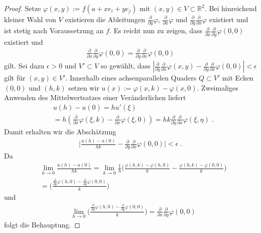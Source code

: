 \begin{proof}
Setze $\varphi(x,y) := f(a + x e_i + y e_j)$ mit $(x,y) \in  V \subset \mathbb{R}^2$. Bei hinreichend kleiner Wahl von $V$ existieren die Ableitungen $ \frac{\partial}{\partial y} \varphi$, $ \frac{\partial}{\partial x} \varphi$ und $ \frac{\partial}{\partial y} \frac{\partial}{\partial x} \varphi$  existiert und ist stetig nach Voraussetzung an $f$. Es reicht nun zu zeigen, dass $ \frac{\partial}{\partial x} \frac{\partial}{\partial y} \varphi (0,0)$ existiert  und 
\begin{align*}
\frac{\partial}{\partial x} \frac{\partial}{\partial y} \varphi(0,0) = \frac{\partial}{\partial y} \frac{\partial}{\partial x} \varphi (0,0)
\end{align*} 
gilt.  Sei dazu $\epsilon > 0$ und $V' \subset V$ so gewählt, dass $| \frac{\partial}{\partial y} \frac{\partial}{\partial x} \varphi(x,y) -  \frac{\partial}{\partial y} \frac{\partial}{\partial x} \varphi(0,0) | < \epsilon$ gilt für $(x,y) \in V'$.
Innerhalb eines achsenparallelen Quaders $Q \subset V'$  mit Ecken $(0,0)$ und $(h,k)$ setzen wir $u(x) := \varphi(x,  k) - \varphi(x, 0)$. Zweimaliges Anwenden des Mittelwertsatzes einer Veränderlichen liefert  
\begin{align*}
& u(h) - u(0) = hu'(\xi) \\
& = h(  \frac{\partial}{\partial x} \varphi(\xi, k) - \frac{\partial}{\partial x} \varphi(\xi, 0) ) = h k \frac{\partial}{\partial y} \frac{\partial}{\partial x} \varphi(\xi, \eta) \; .
\end{align*}
Damit erhalten wir die Abschätzung 
\begin{align*}
\biggl | \frac{ u(h) - u(0)}{hk} -   \frac{\partial}{\partial y} \frac{\partial}{\partial x} \varphi (0,0) \biggr | < \epsilon \; .
\end{align*}
Da 
\begin{align*}
& \lim_{k \to 0 } \frac{ u(h) - u(0)}{hk} =  \lim_{k \to 0 } \frac{1}{h} \biggl(   \frac{\varphi(h,k) - \varphi(h,0)  }{k}  -\frac{\varphi(0,k) - \varphi(0,0)  }{k} \biggr) \\
& =   \biggl(   \frac{  \frac{\partial}{\partial y} \varphi(h,0) -   \frac{\partial}{\partial y}\varphi(0,0)  }{k} \biggr) 
\end{align*}
und 
\begin{align*}
& \lim_{h \to 0 } \biggl(   \frac{  \frac{\partial}{\partial y} \varphi(h,0) -   \frac{\partial}{\partial y}\varphi(0,0)  }{k} \biggr) 
 =     \frac{\partial}{\partial x} \frac{\partial}{\partial y} \varphi(0,0) 
\end{align*}
folgt die Behauptung.
\end{proof}

